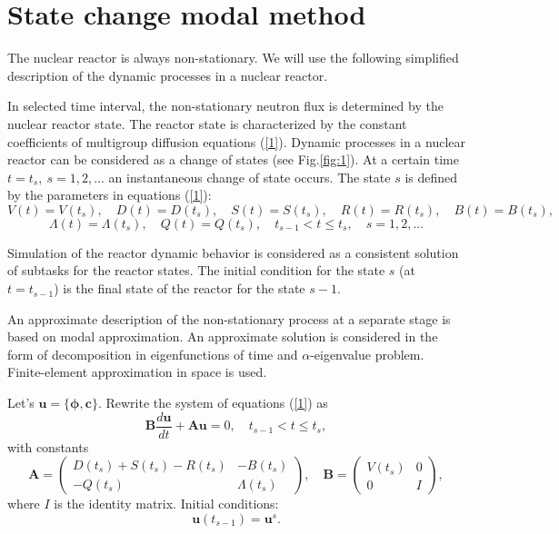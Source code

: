 \documentclass[a4paper]{jpconf}
\begin{document}
\section{State change modal method}
The nuclear reactor is always non-stationary. We will use the following simplified description of the dynamic processes in a nuclear reactor.

In selected time interval, the non-stationary neutron flux is determined by the nuclear reactor state. The reactor state is characterized by the constant coefficients of multigroup diffusion equations (\ref{1}). Dynamic processes in a nuclear reactor can be considered as a change of states  (see  Fig.\ref{fig:1}). 
At a certain time $t = t_s, \ s = 1,2, ...$ an instantaneous change of state occurs. The state $s$ is defined by the parameters in equations  (\ref{1}):
\[
 V(t) = V(t_s), \quad  D(t) = D(t_s), \quad  S(t) = S(t_s), \quad  R(t) = R(t_s), \quad  B(t) = B(t_s),
\] 
\[
 \Lambda(t) = \Lambda(t_s), \quad  Q(t) = Q(t_s),
 \quad t_{s-1} < t \leq t_s, \quad s = 1,2, ... 
\] 


Simulation of the reactor dynamic behavior is considered as a consistent solution of subtasks for the reactor states. The initial condition for the state $s$ (at $t = t_{s-1}$) is the final state of the reactor for the state $s-1$.

An approximate description of the non-stationary process at a separate stage is based on modal approximation. An approximate solution is considered in the form of decomposition in eigenfunctions of time and $\alpha$-eigenvalue problem. Finite-element approximation in space is used.

Let's $\bm u = \{\bm \phi, \bm c\}$. Rewrite the system of equations (\ref{1}) as
\begin{equation}\label{4}
 \bm B \frac{d \bm u}{d t} + \bm A \bm u = 0,
 \quad t_{s-1} < t \leq t_s,
\end{equation} 
with constants
\[
 \bm A = 
 \begin{pmatrix}
 D(t_s)+S(t_s) - R(t_s) &  - B(t_s) \\
 - Q(t_s) & \Lambda(t_s) 
 \end{pmatrix} ,
 \quad  \bm B = 
 \begin{pmatrix}
 V(t_s) & 0 \\
 0 & I 
 \end{pmatrix} ,
\] 
where $I$ is the identity matrix. Initial conditions:
\begin{equation}\label{5}
 \bm u(t_{s-1}) = \bm u^s .
\end{equation} 
\end{document}
